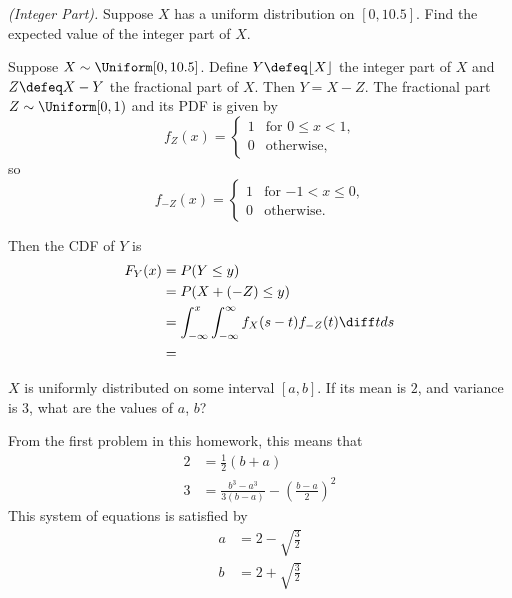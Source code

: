 \begin{problem}[Handout 12, \# 22]
  \emph{(Integer Part).} Suppose \(X\) has a uniform distribution on
  \([0,10.5]\). Find the expected value of the integer part of \(X\).
\end{problem}
\begin{solution}
  Suppose \(X\sim\Uniform[0,10.5]\). Define \(Y\defeq \lfloor X \rfloor\)
  the integer part of \(X\) and \(Z\defeq X-Y\) the fractional part of
  \(X\). Then \(Y=X-Z\). The fractional part \(Z\sim\Uniform[0,1)\) and its
  PDF is given by
  \[
    f_Z(x)=
    \begin{cases}
      1&\text{for \(0\leq x<1\),}\\
      0&\text{otherwise,}
    \end{cases}
  \]
  so
  \[
    f_{{-}Z}(x)=
    \begin{cases}
      1&\text{for \(-1<x\leq 0\),}\\
      0&\text{otherwise.}
    \end{cases}
  \]

  Then the CDF of \(Y\) is
  \begin{align*}
    F_Y(x)
    &=P(Y\leq y)\\
    &=P(X+({-}Z)\leq y)\\
    &=\int_{-\infty}^x\int_{-\infty}^\infty f_X(s-t)f_{{-}Z}(t)\diff t ds\\
    &=
  \end{align*}
\end{solution}
\newpage

\begin{problem}[Handout 12, \# 23]
  \(X\) is uniformly distributed on some interval \([a,b]\). If its mean is
  \(2\), and variance is \(3\), what are the values of \(a\), \(b\)?
\end{problem}
\begin{solution}
  From the first problem in this homework, this means that
  \begin{align*}
    2 &= \frac{1}{2} (b+a)\\
    3 &= \frac{b^3-a^3}{3(b-a)} - \left(\frac{b-a}{2}\right)^2
  \end{align*}
  This system of equations is satisfied by
  \begin{align*}
    a&= 2-\sqrt{\frac{3}{2}} \\
    b&= 2+\sqrt{\frac{3}{2}}
  \end{align*}
\end{solution}

